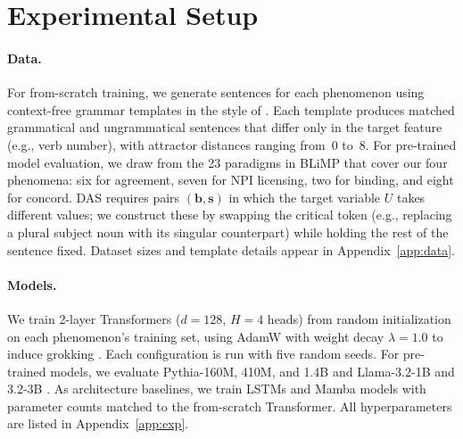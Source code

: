 \documentclass[11pt]{article}
\begin{document}
\section{Experimental Setup}
\label{sec:setup}

\paragraph{Data.}
For from-scratch training, we generate sentences for each phenomenon using context-free grammar templates in the style of \citet{marvin2018targeted}.
Each template produces matched grammatical and ungrammatical sentences that differ only in the target feature (e.g., verb number), with attractor distances ranging from~$0$ to~$8$.
For pre-trained model evaluation, we draw from the 23 paradigms in BLiMP \citep[Benchmark of Linguistic Minimal Pairs;][]{warstadt2020blimp} that cover our four phenomena: six for agreement, seven for NPI licensing, two for binding, and eight for concord.
DAS requires pairs $(\mathbf{b}, \mathbf{s})$ in which the target variable $U$ takes different values; we construct these by swapping the critical token (e.g., replacing a plural subject noun with its singular counterpart) while holding the rest of the sentence fixed.
Dataset sizes and template details appear in Appendix~\ref{app:data}.

\paragraph{Models.}
We train 2-layer Transformers ($d{=}128$, $H{=}4$ heads) from random initialization on each phenomenon's training set, using AdamW \citep{DBLP:conf/iclr/LoshchilovH19} with weight decay $\lambda{=}1.0$ to induce grokking \citep{DBLP:journals/corr/abs-2201-02177}.
Each configuration is run with five random seeds.
For pre-trained models, we evaluate Pythia-160M, 410M, and 1.4B \citep{DBLP:conf/icml/BidermanSABOHKP23} and Llama-3.2-1B and 3.2-3B \citep{DBLP:journals/corr/abs-2407-21783}.
As architecture baselines, we train LSTMs \citep{DBLP:journals/neco/HochreiterS97} and Mamba models \citep{DBLP:journals/corr/abs-2312-00752} with parameter counts matched to the from-scratch Transformer.
All hyperparameters are listed in Appendix~\ref{app:exp}.
\end{document}
